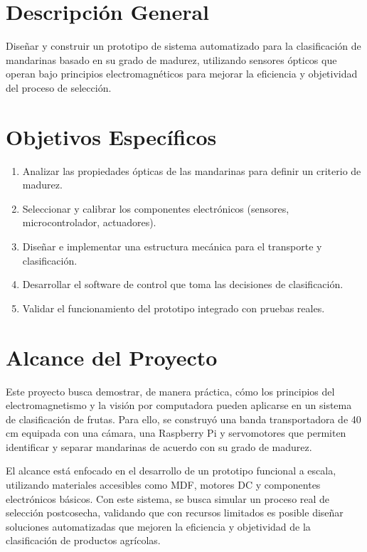 \section{Descripción General}
Diseñar y construir un prototipo de sistema automatizado para la clasificación de mandarinas basado en su grado de madurez, utilizando sensores ópticos que operan bajo principios electromagnéticos para mejorar la eficiencia y objetividad del proceso de selección.

\section{Objetivos Específicos}
\begin{enumerate}
    \item Analizar las propiedades ópticas de las mandarinas para definir un criterio de madurez.
    \item Seleccionar y calibrar los componentes electrónicos (sensores, microcontrolador, actuadores).
    \item Diseñar e implementar una estructura mecánica para el transporte y clasificación.
    \item Desarrollar el software de control que toma las decisiones de clasificación.
    \item Validar el funcionamiento del prototipo integrado con pruebas reales.
\end{enumerate}

\section{Alcance del Proyecto}
Este proyecto busca demostrar, de manera práctica, cómo los principios del electromagnetismo y la visión por computadora pueden aplicarse en un sistema de clasificación de frutas. Para ello, se construyó una banda transportadora de 40 cm equipada con una cámara, una Raspberry Pi y servomotores que permiten identificar y separar mandarinas de acuerdo con su grado de madurez.

El alcance está enfocado en el desarrollo de un prototipo funcional a escala, utilizando materiales accesibles como MDF, motores DC y componentes electrónicos básicos. Con este sistema, se busca simular un proceso real de selección postcosecha, validando que con recursos limitados es posible diseñar soluciones automatizadas que mejoren la eficiencia y objetividad de la clasificación de productos agrícolas.

